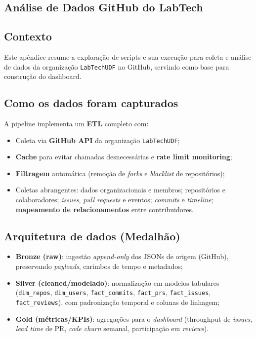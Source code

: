 \documentclass[
	12pt,
	openright,
	oneside,
	a4paper,
	brazil
]{abntex2}
\begin{document}
\begin{apendicesenv}
\chapter{Análise de Dados GitHub do LabTech}
\label{apendiceC}

\section*{Contexto}
Este apêndice resume a exploração de scripts e sua execução para coleta e análise de dados da organização \texttt{LabTechUDF} no GitHub, servindo como base para construção do dashboard.

\section*{Como os dados foram capturados}
A pipeline implementa um \textbf{ETL} completo com:
\begin{itemize}
    \item Coleta via \textbf{GitHub API} da organização \texttt{LabTechUDF};
    \item \textbf{Cache} para evitar chamadas desnecessárias e \textbf{rate limit monitoring};
    \item \textbf{Filtragem} automática (remoção de \textit{forks} e \textit{blacklist} de repositórios);
    \item Coletas abrangentes: dados organizacionais e membros; repositórios e colaboradores; \textit{issues}, \textit{pull requests} e eventos; \textit{commits} e \textit{timeline}; \textbf{mapeamento de relacionamentos} entre contribuidores.
\end{itemize}

\section*{Arquitetura de dados (Medalhão)}
\begin{itemize}
    \item \textbf{Bronze (raw)}: ingestão \emph{append-only} dos JSONs de origem (GitHub), preservando \textit{payloads}, carimbos de tempo e metadados;
    \item \textbf{Silver (cleaned/modelado)}: normalização em modelos tabulares (\texttt{dim\_repos}, \texttt{dim\_users}, \texttt{fact\_commits}, \texttt{fact\_prs}, \texttt{fact\_issues}, \texttt{fact\_reviews}), com padronização temporal e colunas de linhagem;
    \item \textbf{Gold (métricas/KPIs)}: agregações para o \textit{dashboard} (throughput de \textit{issues}, \textit{lead time} de PR, \textit{code churn} semanal, participação em \textit{reviews}).
\end{itemize}


\end{apendicesenv}
\end{document}
